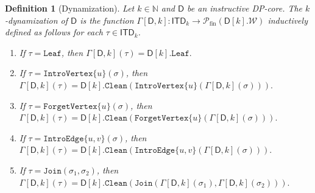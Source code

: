 \documentclass[11pt,a4paper]{article}
\newtheorem{definition}[theorem]{Definition}
\newcommand{\treewidthvalue}{k}
\newcommand{\N}{\mathbb{N}}
\newcommand{\introvertextype}[1]{\mathtt{IntroVertex}\{#1\}}
\newcommand{\introedgetype}[2]{\mathtt{IntroEdge}\{#1,#2\}}
\newcommand{\forgetvertextype}[1]{\mathtt{ForgetVertex}\{#1\}}
\newcommand{\jointype}{\mathtt{Join}}
\newcommand{\leaftype}{\mathtt{Leaf}}
\newcommand{\introvertexgeneric}[1]{\mathtt{IntroVertex}\{#1\}}
\newcommand{\initialsetgeneric}{\mathtt{Leaf}}
\newcommand{\cleaningfunctioncore}{\mathtt{Clean}}
\newcommand{\allabstractdecompositionstreewidth}[1]{\mathsf{ITD}_{#1}}
\newcommand{\abstractdecomposition}{\tau}
\newcommand{\sigmaabstractdecomposition}{\sigma}
\newcommand{\vertexone}{u}
\newcommand{\vertextwo}{v}
\newcommand{\allwitnesses}{\mathcal{W}}
\newcommand{\awitness}{\mathsf{w}}
\newcommand{\finitepowerset}[1]{\mathcal{P}_{\mathrm{fin}}(#1)}
\newcommand{\dpcore}{\mathsf{D}}
\newcommand{\dynamizationfunctionname}[1]{\Gamma[{#1}]}
\newcommand{\dynamizationfunction}[2]{\dynamizationfunctionname{#1,#2}}
\begin{document}
\begin{definition}[Dynamization]
\label{definition:Dynamization}
Let $\treewidthvalue\in \N$ and $\dpcore$ be an instructive DP-core.
The $\treewidthvalue$-dynamization of $\dpcore$ is the function
$\dynamizationfunctionname{\dpcore,\treewidthvalue}:\allabstractdecompositionstreewidth{\treewidthvalue}\rightarrow \finitepowerset{\dpcore[\treewidthvalue].\allwitnesses}$
inductively
defined as follows for each $\abstractdecomposition\in \allabstractdecompositionstreewidth{\treewidthvalue}$.
\begin{enumerate}
\setlength\itemsep{0em}
\item If $\abstractdecomposition = \leaftype$, then
$\dynamizationfunction{\dpcore}{\treewidthvalue}(\abstractdecomposition)=\dpcore[\treewidthvalue].\initialsetgeneric.$
\item If $\abstractdecomposition = \introvertextype{\vertexone}(\sigmaabstractdecomposition)$, then
%
$
\dynamizationfunction{\dpcore}{\treewidthvalue}(\abstractdecomposition)= %
\dpcore[\treewidthvalue].\cleaningfunctioncore(
\introvertextype{\vertexone}(
\dynamizationfunction{\dpcore}{\treewidthvalue}(\sigmaabstractdecomposition)
)
).
$
%
\item If $\abstractdecomposition = \forgetvertextype{\vertexone}(\sigmaabstractdecomposition)$, then
$
 \dynamizationfunction{\dpcore}{\treewidthvalue}(\abstractdecomposition)=
  \dpcore[\treewidthvalue].\cleaningfunctioncore(
  \forgetvertextype{\vertexone}(
 \dynamizationfunction{\dpcore}{\treewidthvalue}(\sigmaabstractdecomposition)
)
).
$
\item If $\abstractdecomposition = \introedgetype{\vertexone}{\vertextwo}(\sigmaabstractdecomposition)$, then
$\dynamizationfunction{\dpcore}{\treewidthvalue}(\abstractdecomposition)=
\dpcore[\treewidthvalue].\cleaningfunctioncore(
\introedgetype{\vertexone}{\vertextwo}(
\dynamizationfunction{\dpcore}{\treewidthvalue}(\sigmaabstractdecomposition))).$
%
\item If $\abstractdecomposition = \jointype(\sigmaabstractdecomposition_1,\sigmaabstractdecomposition_2)$, then
$
\dynamizationfunction{\dpcore}{\treewidthvalue}(\abstractdecomposition)=
\dpcore[\treewidthvalue].\cleaningfunctioncore(\jointype(
\dynamizationfunction{\dpcore}{\treewidthvalue}(\sigmaabstractdecomposition_1), \dynamizationfunction{\dpcore}{\treewidthvalue}(\sigmaabstractdecomposition_2)
)
).$
\end{enumerate}
\end{definition}
\end{document}
